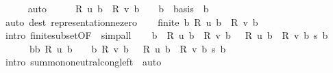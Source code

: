 \begin{isabellebody}
\ \ \ \ \isamarkupfalse%
\ auto\isanewline
\ \ \isamarkupfalse%
\ \isamarkupfalse%
\ {\isachardoublequoteopen}{\isacharquery}{\kern0pt}R\ u\ b\ {\isacharminus}{\kern0pt}\ {\isacharquery}{\kern0pt}R\ v\ b\ {\isasymnoteq}\ {}\ {\isasymLongrightarrow}\ b\ {\isasymin}\ basis{\isachardoublequoteclose}\ \ b\isanewline
\ \ \ \ \isamarkupfalse%
\ {\isacharparenleft}{\kern0pt}auto\ dest{\isacharcolon}{\kern0pt}\ representation{\isacharunderscore}{\kern0pt}ne{\isacharunderscore}{\kern0pt}zero{\isacharparenright}{\kern0pt}\isanewline
\ \ \isamarkupfalse%
\ {\isachardoublequoteopen}finite\ {\isacharbraceleft}{\kern0pt}b{\isachardot}{\kern0pt}\ {\isacharquery}{\kern0pt}R\ u\ b\ {\isacharminus}{\kern0pt}\ {\isacharquery}{\kern0pt}R\ v\ b\ {\isasymnoteq}\ {}{\isacharbraceright}{\kern0pt}{\isachardoublequoteclose}\isanewline
\ \ \ \ \isamarkupfalse%
\ {\isacharparenleft}{\kern0pt}intro\ finite{\isacharunderscore}{\kern0pt}subset{\isacharbrackleft}{\kern0pt}OF\ {\isacharasterisk}{\kern0pt}{\isacharbrackright}{\kern0pt}{\isacharparenright}{\kern0pt}\ simp{\isacharunderscore}{\kern0pt}all\isanewline
\ \ \isamarkupfalse%
\ {\isachardoublequoteopen}{\isacharparenleft}{\kern0pt}{\isasymSum}b\ {\isacharbar}{\kern0pt}\ {\isacharquery}{\kern0pt}R\ u\ b\ {\isacharminus}{\kern0pt}\ {\isacharquery}{\kern0pt}R\ v\ b\ {\isasymnoteq}\ {}{\isachardot}{\kern0pt}\ {\isacharparenleft}{\kern0pt}{\isacharquery}{\kern0pt}R\ u\ b\ {\isacharminus}{\kern0pt}\ {\isacharquery}{\kern0pt}R\ v\ b{\isacharparenright}{\kern0pt}\ {\isacharasterisk}{\kern0pt}s\ b{\isacharparenright}{\kern0pt}\ {\isacharequal}{\kern0pt}\isanewline
\ \ \ \ \ \ {\isacharparenleft}{\kern0pt}{\isasymSum}b{\isasymin}{\isacharbraceleft}{\kern0pt}b{\isachardot}{\kern0pt}\ {\isacharquery}{\kern0pt}R\ u\ b\ {\isasymnoteq}\ {}{\isacharbraceright}{\kern0pt}\ {\isasymunion}\ {\isacharbraceleft}{\kern0pt}b{\isachardot}{\kern0pt}\ {\isacharquery}{\kern0pt}R\ v\ b\ {\isasymnoteq}\ {}{\isacharbraceright}{\kern0pt}{\isachardot}{\kern0pt}\ {\isacharparenleft}{\kern0pt}{\isacharquery}{\kern0pt}R\ u\ b\ {\isacharminus}{\kern0pt}\ {\isacharquery}{\kern0pt}R\ v\ b{\isacharparenright}{\kern0pt}\ {\isacharasterisk}{\kern0pt}s\ b{\isacharparenright}{\kern0pt}{\isachardoublequoteclose}\isanewline
\ \ \ \ \isamarkupfalse%
\ {\isacharparenleft}{\kern0pt}intro\ sum{\isachardot}{\kern0pt}mono{\isacharunderscore}{\kern0pt}neutral{\isacharunderscore}{\kern0pt}cong{\isacharunderscore}{\kern0pt}left\ {\isacharasterisk}{\kern0pt}{\isacharparenright}{\kern0pt}\ auto\isanewline

\end{isabellebody}
